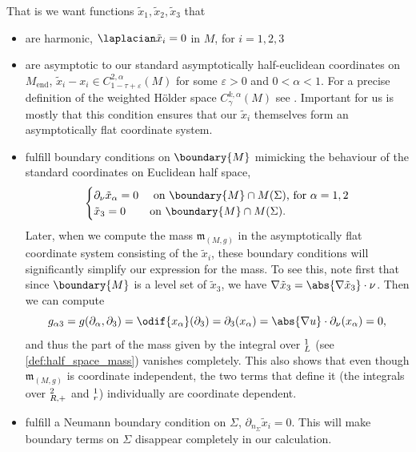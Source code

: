 \documentclass[titlepage,numbers=noenddot,headinclude,oneside,%
footinclude=true,cleardoublepage=empty,%
BCOR=5mm,paper=a4,fontsize=11pt,%
english,%
]{scrartcl}
\let\sphere\relax
\newcommand{\sphere}{\mathbb{S}}
\newcommand{\Mend}{M_{\mathrm{end}}} %
\newcommand{\mass}[2]{\mathfrak{m}_{(#1,#2)}} %
\begin{document}
That is we want functions \( \tilde{x}_1,\tilde{x}_2,\tilde{x}_3 \) that
\begin{itemize}
    \item are harmonic, \ie \( \laplacian \tilde{x}_i=0 \) in \( M \), for \( i=1,2,3 \)
    \item are asymptotic to our standard asymptotically half-euclidean coordinates on \(  \Mend \), \ie \( \tilde{x}_i-x_i\in C_{1-\tau+\varepsilon}^{2,\alpha}(M) \) for some \( \varepsilon>0 \) and \( 0<\alpha<1 \). 
    For a precise definition of the weighted Hölder space \( C_\gamma^{k,\alpha}(M) \) see \cite[Section 3]{almarazPositiveMassTheorem2016}.
    Important for us is mostly that this condition ensures that our \( \tilde{x}_i \) themselves form an asymptotically flat coordinate system.


    \item fulfill boundary conditions on \( \boundary{M} \) mimicking the behaviour of the standard coordinates on Euclidean half space, \ie
    \begin{equation*}
        \begin{cases}
            \partial_\nu \tilde{x}_\alpha=0 &\text{ on \( \boundary{M} \cap M(\Sigma) \), for \( \alpha=1,2 \)}\\
            \tilde{x}_3=0 &\text{on \( \boundary{M}\cap M(\Sigma) \)}.
        \end{cases}
    \end{equation*}
    Later, when we compute the mass \( \mass{M}{g} \) in the asymptotically flat coordinate system consisting of the \( \tilde{x}_i \), these boundary conditions will significantly simplify our expression for the mass. To see this, note first that since \( \boundary{M} \) is a level set of \( \tilde{x}_3 \), we have \( \nabla \tilde{x}_3=\abs{\nabla \tilde{x}_3}\cdot \nu \). Then we can compute
    \begin{equation}
        g_{\alpha 3}=g(\partial_\alpha,\partial_3)=\odif{x_{\alpha}}(\partial_3)=\partial_{3}(x_\alpha)=\abs{\nabla u}\cdot \partial_\nu (x_\alpha)=0,\label{eq:mass_expression_simplifies}
    \end{equation}
    and thus the part of the mass given by the integral over \( \sphere^1_L \) (see \cref{def:half_space_mass}) vanishes completely. This also shows that even though \( \mass{M}{g} \) is coordinate independent, the two terms that define it (the integrals over \( \sphere^2_{R,+} \) and \( \sphere_r^1 \)) individually are coordinate dependent.

    \item fulfill a Neumann boundary condition on \( \Sigma \), \ie \( \partial_{n_\Sigma}\tilde{x}_i=0 \). This will make boundary terms on \( \Sigma \) disappear completely in our calculation.
\end{itemize} 
\end{document}
